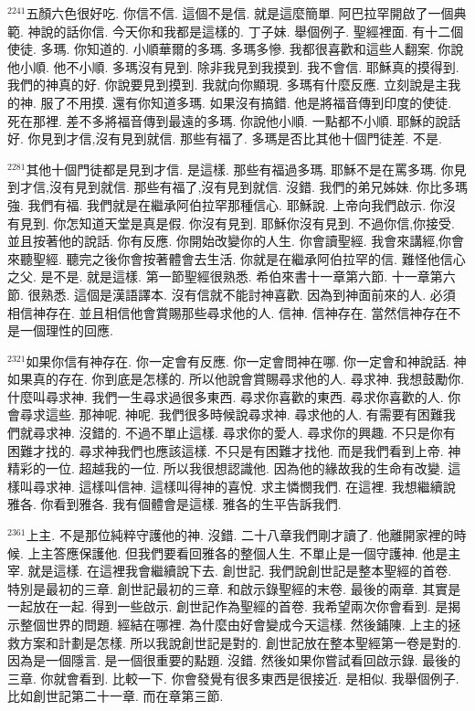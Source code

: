 \documentclass{book}
\begin{document}
$^{2241}$五顏六色很好吃.
你信不信.
這個不是信.
就是這麼簡單.
阿巴拉罕開啟了一個典範.
神說的話你信.
今天你和我都是這樣的.
丁子妹.
舉個例子.
聖經裡面.
有十二個使徒.
多瑪.
你知道的.
小順華爾的多瑪.
多瑪多慘.
我都很喜歡和這些人翻案.
你說他小順.
他不小順.
多瑪沒有見到.
除非我見到我摸到.
我不會信.
耶穌真的摸得到.
我們的神真的好.
你說要見到摸到.
我就向你顯現.
多瑪有什麼反應.
立刻說是主我的神.
服了不用摸.
還有你知道多瑪.
如果沒有搞錯.
他是將福音傳到印度的使徒.
死在那裡.
差不多將福音傳到最遠的多瑪.
你說他小順.
一點都不小順.
耶穌的說話好.
你見到才信,沒有見到就信.
那些有福了.
多瑪是否比其他十個門徒差.
不是.

$^{2281}$其他十個門徒都是見到才信.
是這樣.
那些有福過多瑪.
耶穌不是在罵多瑪.
你見到才信,沒有見到就信.
那些有福了,沒有見到就信.
沒錯.
我們的弟兄姊妹.
你比多瑪強.
我們有福.
我們就是在繼承阿伯拉罕那種信心.
耶穌說.
上帝向我們啟示.
你沒有見到.
你怎知道天堂是真是假.
你沒有見到.
耶穌你沒有見到.
不過你信,你接受.
並且按著他的說話.
你有反應.
你開始改變你的人生.
你會讀聖經.
我會來講經,你會來聽聖經.
聽完之後你會按著體會去生活.
你就是在繼承阿伯拉罕的信.
難怪他信心之父.
是不是.
就是這樣.
第一節聖經很熟悉.
希伯來書十一章第六節.
十一章第六節.
很熟悉.
這個是漢語譯本.
沒有信就不能討神喜歡.
因為到神面前來的人.
必須相信神存在.
並且相信他會賞賜那些尋求他的人.
信神.
信神存在.
當然信神存在不是一個理性的回應.

$^{2321}$如果你信有神存在.
你一定會有反應.
你一定會問神在哪.
你一定會和神說話.
神如果真的存在.
你到底是怎樣的.
所以他說會賞賜尋求他的人.
尋求神.
我想鼓勵你.
什麼叫尋求神.
我們一生尋求過很多東西.
尋求你喜歡的東西.
尋求你喜歡的人.
你會尋求這些.
那神呢.
神呢.
我們很多時候說尋求神.
尋求他的人.
有需要有困難我們就尋求神.
沒錯的.
不過不單止這樣.
尋求你的愛人.
尋求你的興趣.
不只是你有困難才找的.
尋求神我們也應該這樣.
不只是有困難才找他.
而是我們看到上帝.
神精彩的一位.
超越我的一位.
所以我很想認識他.
因為他的緣故我的生命有改變.
這樣叫尋求神.
這樣叫信神.
這樣叫得神的喜悅.
求主憐憫我們.
在這裡.
我想繼續說雅各.
你看到雅各.
我有個體會是這樣.
雅各的生平告訴我們.

$^{2361}$上主.
不是那位純粹守護他的神.
沒錯.
二十八章我們剛才讀了.
他離開家裡的時候.
上主答應保護他.
但我們要看回雅各的整個人生.
不單止是一個守護神.
他是主宰.
就是這樣.
在這裡我會繼續說下去.
創世記.
我們說創世記是整本聖經的首卷.
特別是最初的三章.
創世記最初的三章.
和啟示錄聖經的末卷.
最後的兩章.
其實是一起放在一起.
得到一些啟示.
創世記作為聖經的首卷.
我希望兩次你會看到.
是揭示整個世界的問題.
經結在哪裡.
為什麼由好會變成今天這樣.
然後鋪陳.
上主的拯救方案和計劃是怎樣.
所以我說創世記是對的.
創世記放在整本聖經第一卷是對的.
因為是一個隱言.
是一個很重要的點題.
沒錯.
然後如果你嘗試看回啟示錄.
最後的三章.
你就會看到.
比較一下.
你會發覺有很多東西是很接近.
是相似.
我舉個例子.
比如創世記第二十一章.
而在章第三節.
\end{document}
